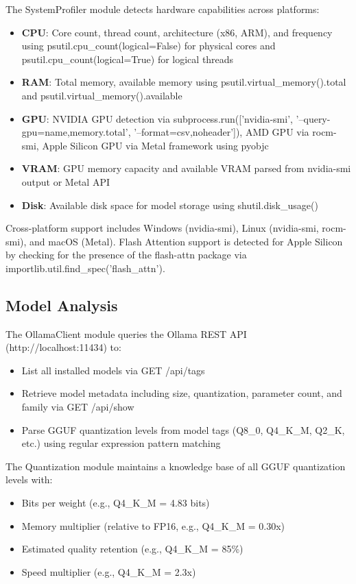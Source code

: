 \documentclass[journal]{IEEEtran}
\begin{document}
The SystemProfiler module detects hardware capabilities across platforms:
\begin{itemize}
    \item \textbf{CPU}: Core count, thread count, architecture (x86, ARM), and frequency using psutil.cpu\_count(logical=False) for physical cores and psutil.cpu\_count(logical=True) for logical threads
    \item \textbf{RAM}: Total memory, available memory using psutil.virtual\_memory().total and psutil.virtual\_memory().available
    \item \textbf{GPU}: NVIDIA GPU detection via subprocess.run(['nvidia-smi', '--query-gpu=name,memory.total', '--format=csv,noheader']), AMD GPU via rocm-smi, Apple Silicon GPU via Metal framework using pyobjc
    \item \textbf{VRAM}: GPU memory capacity and available VRAM parsed from nvidia-smi output or Metal API
    \item \textbf{Disk}: Available disk space for model storage using shutil.disk\_usage()
\end{itemize}

Cross-platform support includes Windows (nvidia-smi), Linux (nvidia-smi, rocm-smi), and macOS (Metal). Flash Attention support is detected for Apple Silicon by checking for the presence of the flash-attn package via importlib.util.find\_spec('flash\_attn').

\subsection{Model Analysis}

The OllamaClient module queries the Ollama REST API (http://localhost:11434) to:
\begin{itemize}
    \item List all installed models via GET /api/tags
    \item Retrieve model metadata including size, quantization, parameter count, and family via GET /api/show
    \item Parse GGUF quantization levels from model tags (Q8\_0, Q4\_K\_M, Q2\_K, etc.) using regular expression pattern matching
\end{itemize}

The Quantization module maintains a knowledge base of all GGUF quantization levels with:
\begin{itemize}
    \item Bits per weight (e.g., Q4\_K\_M = 4.83 bits)
    \item Memory multiplier (relative to FP16, e.g., Q4\_K\_M = 0.30x)
    \item Estimated quality retention (e.g., Q4\_K\_M = 85\%)
    \item Speed multiplier (e.g., Q4\_K\_M = 2.3x)
\end{itemize}
\end{document}
